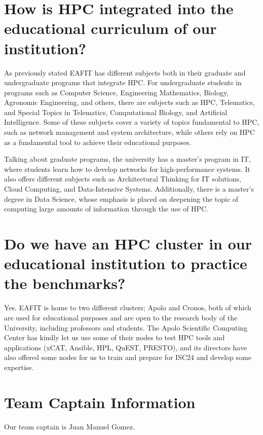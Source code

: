 \documentclass[11pt,a4paper,twocolumn]{article}
\begin{document}
\section{How is HPC integrated into the educational curriculum of our institution?}

As previously stated EAFIT has different subjects both in their graduate and undergraduate programs that integrate HPC. For undergraduate students in programs such as Computer Science, Engineering Mathematics, Biology, Agronomic Engineering, and others, there are subjects such as HPC, Telematics, and Special Topics in Telematics, Computational Biology, and Artificial Intelligence. Some of these subjects cover a variety of topics fundamental to HPC, such as network management and system architecture, while others rely on HPC as a fundamental tool to achieve their educational purposes.

Talking about graduate programs, the university has a master's program in IT, where students learn how to develop networks for high-performance systems. It also offers different subjects such as Architectural Thinking for IT solutions, Cloud Computing, and Data-Intensive Systems. Additionally, there is a master’s degree in Data Science, whose emphasis is placed on deepening the topic of computing large amounts of information through the use of HPC.

\section{Do we have an HPC cluster in our educational institution to practice the benchmarks?}

Yes. EAFIT is home to two different clusters; Apolo and Cronos, both of which are used for educational purposes and are open to the research body of the University, including professors and students. The Apolo Scientific Computing Center has kindly let us use some of their nodes to test HPC tools and applications (xCAT, Ansible, HPL, QuEST, PRESTO), and its directors have also offered some nodes for us to train and prepare for ISC24 and develop some expertise.

\section{Team Captain Information}
Our team captain is Juan Manuel Gomez.
\end{document}

